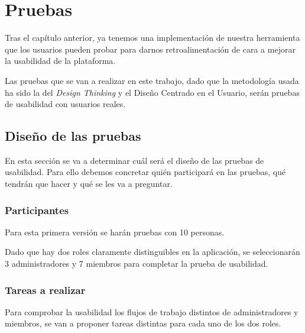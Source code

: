 \chapter{Pruebas}









Tras el capítulo anterior, ya tenemos una implementación de nuestra herramienta que los usuarios pueden probar para darnos retroalimentación de cara a mejorar la usabilidad de la plataforma.

Las pruebas que se van a realizar en este trabajo, dado que la metodología usada ha sido la del \textit{Design Thinking} y el Diseño Centrado en el Usuario, serán pruebas de usabilidad con usuarios reales.

\section{Diseño de las pruebas}

En esta sección se va a determinar cuál será el diseño de las pruebas de usabilidad. Para ello debemos concretar quién participará en las pruebas, qué tendrán que hacer y qué se les va a preguntar.

\subsection{Participantes}

Para esta primera versión se harán pruebas con 10 personas.

Dado que hay dos roles claramente distinguibles en la aplicación, se seleccionarán 3 administradores y 7 miembros para completar la prueba de usabilidad.


\subsection{Tareas a realizar}

Para comprobar la usabilidad los flujos de trabajo distintos de administradores y miembros, se van a proponer tareas distintas para cada uno de los dos roles.

